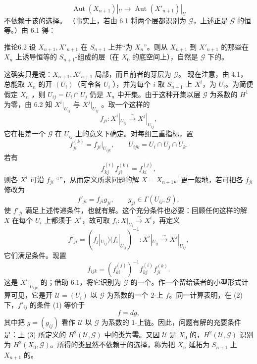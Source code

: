 \[\operatorname{Aut}(X_{n+1})|_U\longrightarrow\operatorname{Aut}(X'_{n+1})|_U\]
不依赖于该的选择。
（事实上，若由 6.1 将两个层都识别为 $\mathcal G$，上述正是 $\mathcal G$ 的恒等。）由 6.1 得：
\begin{SGAresult}{推论}{6.2}
设 $X_{n+1},X'_{n+1}$ 在 $S_{n+1}$ 上并“为 $X_n$”。则从 $X_{n+1}$ 到 $X'_{n+1}$ 的那些在 $X_n$ 上诱导恒等的 $S_{n+1}$-组成的层（在 $X_0$ 的底空间上），自然是 $\mathcal G$ 下的。
\end{SGAresult}
这确实只是说：$X_{n+1},X'_{n+1}$ 局部，而且前者的芽层为 $\mathcal G$。
现在注意，由 4.1，总能取 $X_n$ 的开 $(U_i)$（可令各 $U_i$ ），并为每个 $i$ 取 $S_{n+1}$ 上 $X^i$，为 $U_i$。为简便假定 $X_n$ ，则 $U_{ij}=U_i\cap U_j$ 仍是 $X_n$ 中开集。由于这种开集以层 $\mathcal G$ 为系数的 $H^1$ 为零，由 6.2 知 $X^i|_{U_{ij}}$ 与 $X^j|_{U_{ij}}$ 。取一个这样的
\[f_{ji}:X^i|_{U_{ij}}\xrightarrow{\sim}X^j|_{U_{ij}},\]
它在相差一个 $\mathcal G$ 在 $U_{ij}$ 上的意义下确定。对每组三重指标，置
\[f_{ji}^{(k)}=f_{ji}|_{U_{ijk}},\qquad U_{ijk}=U_i\cap U_j\cap U_k.\]
若有
\[f_{kj}^{(i)}f_{ji}^{(k)}=f_{ki}^{(j)},\tag{1}\]
则各 $X^i$ 可沿 $f_{ji}$ “”，从而定义所求问题的解 $X=X_{n+1}$。更一般地，若可把各 $f_{ji}$ 修改为
\[f'_{ji}=f_{ji}g_{ji},\qquad g_{ji}\in\Gamma(U_{ij},\mathcal G),\tag{2}\]
使 $f'_{ji}$ 满足上述传递条件，也就有解。这个充分条件也必要：回顾任何这样的解 $X$ 在每个 $U_i$ 上都须于 $X^i$，故可取 $f_i:X|_{U_i}\xrightarrow{\sim}X^i$，再定义
\[f'_{ji}=(f_j|_{U_{ij}})(f_i|_{U_{ij}})^{-1}:X^i|_{U_{ij}}\xrightarrow{\sim}X^j|_{U_{ij}},\]
它们满足条件。现置
\[f_{ijk}=(f_{ki}^{(j)})^{-1}f_{kj}^{(i)}f_{ji}^{(k)}.\tag{3}\]
这是 $X^i|_{U_{ijk}}$ 的；借助 6.1，将它识别为 $\mathcal G$ 的一个。作一个留给读者的小型形式计算可见，它是开 $\mathcal U=(U_i)$ 以 $\mathcal G$ 为系数的一个 $2$-上 $f$。同一计算表明，在 (2) 下，$f'_{ij}$ 的条件 (1) 等价于
\[f=dg,\tag{4}\]
其中把 $g=(g_{ij})$ 看作 $\mathcal U$ 以 $\mathcal G$ 为系数的 $1$-上链。因此，问题有解的充要条件是：上 (3) 所定义的 $H^2(\mathcal U,\mathcal G)$ 中的类为零。又因 $\mathcal U$ 是 $X_0$ 的，$H^2(\mathcal U,\mathcal G)$ 识别为 $H^2(X_0,\mathcal G)$。所得的类显然不依赖于的选择，称为把 $X_n$ 延拓为 $S_{n+1}$ 上 $X_{n+1}$ 的。

